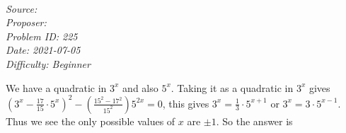 \SSbreak\\
\emph{Source: \Cfolk}\\
\emph{Proposer: \Pss}\\
\emph{Problem ID: 225}\\
\emph{Date: 2021-07-05}\\
\emph{Difficulty: Beginner}\\
\SSbreak

\bigskip

\begin{solution}\hfil\medskip
  
We have a quadratic in \(3^x\) and also \(5^x\). Taking it as a quadratic in \(3^x\) gives \(\left(3^x-\frac{17}{15}\cdot5^x\right)^2-\left(\frac{15^2-17^2}{15^2}\right)5^{2x}=0\), this gives \(3^x=\frac{1}{3}\cdot 5^{x+1}\) or \(3^x=3\cdot5^{x-1}\). Thus we see the only possible values of \(x\) are \(\pm 1\). So the answer is 
\end{solution}\bigskip

